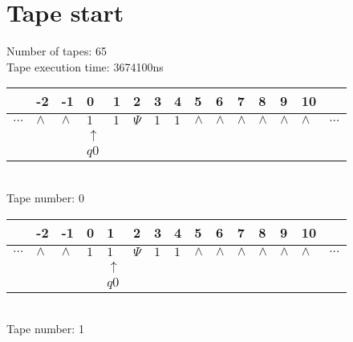 \documentclass{article}
\begin{document}
\section{Tape start}
Number of tapes: 65\\
Tape execution time: 3674100ns\\

\begin{table}[H]
\centering
\begin{tabular}{lllllllllllllll}
 & -2 & -1 & 0 & 1 & 2 & 3 & 4 & 5 & 6 & 7 & 8 & 9 & 10 & \\
\hline
$...$ & \multicolumn{1}{|l|}{$\wedge$} & \multicolumn{1}{|l|}{$\wedge$} & \multicolumn{1}{|l|}{$1$} & \multicolumn{1}{|l|}{$1$} & \multicolumn{1}{|l|}{$\Psi$} & \multicolumn{1}{|l|}{$1$} & \multicolumn{1}{|l|}{$1$} & \multicolumn{1}{|l|}{$\wedge$} & \multicolumn{1}{|l|}{$\wedge$} & \multicolumn{1}{|l|}{$\wedge$} & \multicolumn{1}{|l|}{$\wedge$} & \multicolumn{1}{|l|}{$\wedge$} & \multicolumn{1}{|l|}{$\wedge$} & $...$\\
\hline
&  &  & $\uparrow$ &  &  &  &  &  &  &  &  &  &  &  \\
&  &  & $ q0 $ &  &  &  &  &  &  &  &  &  &  &  \\
\end{tabular}
\\
Tape number: 0
\noindent\makebox[\linewidth]{\hdashrule{\textwidth}{1pt}{1pt}}\end{table}

\begin{table}[H]
\centering
\begin{tabular}{lllllllllllllll}
 & -2 & -1 & 0 & 1 & 2 & 3 & 4 & 5 & 6 & 7 & 8 & 9 & 10 & \\
\hline
$...$ & \multicolumn{1}{|l|}{$\wedge$} & \multicolumn{1}{|l|}{$\wedge$} & \multicolumn{1}{|l|}{$1$} & \multicolumn{1}{|l|}{$1$} & \multicolumn{1}{|l|}{$\Psi$} & \multicolumn{1}{|l|}{$1$} & \multicolumn{1}{|l|}{$1$} & \multicolumn{1}{|l|}{$\wedge$} & \multicolumn{1}{|l|}{$\wedge$} & \multicolumn{1}{|l|}{$\wedge$} & \multicolumn{1}{|l|}{$\wedge$} & \multicolumn{1}{|l|}{$\wedge$} & \multicolumn{1}{|l|}{$\wedge$} & $...$\\
\hline
&  &  &  & $\uparrow$ &  &  &  &  &  &  &  &  &  &  \\
&  &  &  & $ q0 $ &  &  &  &  &  &  &  &  &  &  \\
\end{tabular}
\\
Tape number: 1
\noindent\makebox[\linewidth]{\hdashrule{\textwidth}{1pt}{1pt}}\end{table}
\end{document}
